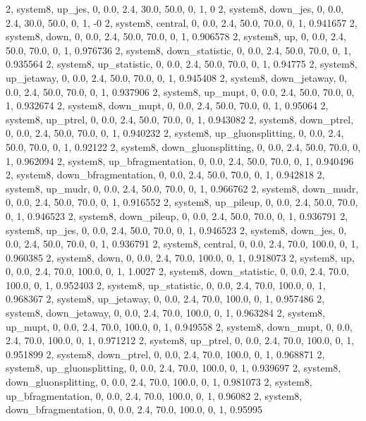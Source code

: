 2, system8, up_jes,          0, 0.0, 2.4, 30.0, 50.0, 0, 1, 0
2, system8, down_jes,        0, 0.0, 2.4, 30.0, 50.0, 0, 1, -0
2, system8, central,    0, 0.0, 2.4, 50.0, 70.0, 0, 1, 0.941657
2, system8, down,       0, 0.0, 2.4, 50.0, 70.0, 0, 1, 0.906578
2, system8, up,         0, 0.0, 2.4, 50.0, 70.0, 0, 1, 0.976736
2, system8, down_statistic,       0, 0.0, 2.4, 50.0, 70.0, 0, 1, 0.935564
2, system8, up_statistic,         0, 0.0, 2.4, 50.0, 70.0, 0, 1, 0.94775
2, system8, up_jetaway,      0, 0.0, 2.4, 50.0, 70.0, 0, 1, 0.945408
2, system8, down_jetaway,    0, 0.0, 2.4, 50.0, 70.0, 0, 1, 0.937906
2, system8, up_mupt,         0, 0.0, 2.4, 50.0, 70.0, 0, 1, 0.932674
2, system8, down_mupt,       0, 0.0, 2.4, 50.0, 70.0, 0, 1, 0.95064
2, system8, up_ptrel,        0, 0.0, 2.4, 50.0, 70.0, 0, 1, 0.943082
2, system8, down_ptrel,      0, 0.0, 2.4, 50.0, 70.0, 0, 1, 0.940232
2, system8, up_gluonsplitting, 0, 0.0, 2.4, 50.0, 70.0, 0, 1, 0.92122
2, system8, down_gluonsplitting, 0, 0.0, 2.4, 50.0, 70.0, 0, 1, 0.962094
2, system8, up_bfragmentation, 0, 0.0, 2.4, 50.0, 70.0, 0, 1, 0.940496
2, system8, down_bfragmentation, 0, 0.0, 2.4, 50.0, 70.0, 0, 1, 0.942818
2, system8, up_mudr,         0, 0.0, 2.4, 50.0, 70.0, 0, 1, 0.966762
2, system8, down_mudr,       0, 0.0, 2.4, 50.0, 70.0, 0, 1, 0.916552
2, system8, up_pileup,       0, 0.0, 2.4, 50.0, 70.0, 0, 1, 0.946523
2, system8, down_pileup,     0, 0.0, 2.4, 50.0, 70.0, 0, 1, 0.936791
2, system8, up_jes,          0, 0.0, 2.4, 50.0, 70.0, 0, 1, 0.946523
2, system8, down_jes,        0, 0.0, 2.4, 50.0, 70.0, 0, 1, 0.936791
2, system8, central,    0, 0.0, 2.4, 70.0, 100.0, 0, 1, 0.960385
2, system8, down,       0, 0.0, 2.4, 70.0, 100.0, 0, 1, 0.918073
2, system8, up,         0, 0.0, 2.4, 70.0, 100.0, 0, 1, 1.0027
2, system8, down_statistic,       0, 0.0, 2.4, 70.0, 100.0, 0, 1, 0.952403
2, system8, up_statistic,         0, 0.0, 2.4, 70.0, 100.0, 0, 1, 0.968367
2, system8, up_jetaway,      0, 0.0, 2.4, 70.0, 100.0, 0, 1, 0.957486
2, system8, down_jetaway,    0, 0.0, 2.4, 70.0, 100.0, 0, 1, 0.963284
2, system8, up_mupt,         0, 0.0, 2.4, 70.0, 100.0, 0, 1, 0.949558
2, system8, down_mupt,       0, 0.0, 2.4, 70.0, 100.0, 0, 1, 0.971212
2, system8, up_ptrel,        0, 0.0, 2.4, 70.0, 100.0, 0, 1, 0.951899
2, system8, down_ptrel,      0, 0.0, 2.4, 70.0, 100.0, 0, 1, 0.968871
2, system8, up_gluonsplitting, 0, 0.0, 2.4, 70.0, 100.0, 0, 1, 0.939697
2, system8, down_gluonsplitting, 0, 0.0, 2.4, 70.0, 100.0, 0, 1, 0.981073
2, system8, up_bfragmentation, 0, 0.0, 2.4, 70.0, 100.0, 0, 1, 0.96082
2, system8, down_bfragmentation, 0, 0.0, 2.4, 70.0, 100.0, 0, 1, 0.95995
